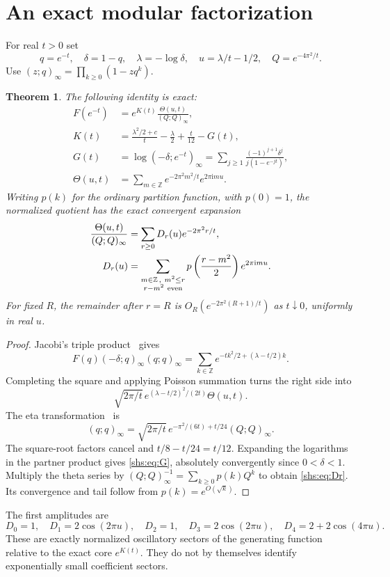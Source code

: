 \documentclass[11pt]{article}
\newtheorem{theorem}{Theorem}[section]
\newcommand{\ii}{\mathrm{i}}
\theoremstyle{definition}
\theoremstyle{plain}
\begin{document}
\section{An exact modular factorization}\label{shs:sec:modular}
For real $t>0$ set
\[
 q=e^{-t},\quad \delta=1-q,\quad \lambda=-\log\delta,\quad
 u=\lambda/t-1/2,\quad Q=e^{-4\pi^2/t}.
\]
Use $(z;q)_\infty=\prod_{k\ge0}(1-zq^k)$.
\begin{theorem}\label{shs:thm:modular}
The following identity is exact:
\begin{align}
 F(e^{-t})&=e^{K(t)}\frac{\Theta(u,t)}{(Q;Q)_\infty},\label{shs:eq:modular}\\
 K(t)&=\frac{\lambda^2/2+c}{t}-\frac\lambda2+\frac t{12}-G(t),\label{shs:eq:K}\\
 G(t)&=\log(-\delta;e^{-t})_\infty
 =\sum_{j\ge1}\frac{(-1)^{j+1}\delta^j}{j(1-e^{-jt})},\label{shs:eq:G}\\
 \Theta(u,t)&=\sum_{m\in\mathbb Z}e^{-2\pi^2m^2/t}e^{2\pi\ii m u}.
\end{align}
Writing $p(k)$ for the ordinary partition function, with $p(0)=1$, the
normalized quotient has the exact convergent expansion
\begin{align}
 \frac{\Theta(u,t)}{(Q;Q)_\infty}
 &=\sum_{r\ge0}D_r(u)e^{-2\pi^2r/t},\label{shs:eq:sectors}\\
 D_r(u)&=\sum_{\substack{m\in\mathbb Z\,,\ m^2\le r\\r-m^2\ {\rm even}}}
 p\left(\frac{r-m^2}{2}\right)e^{2\pi\ii m u}.\label{shs:eq:Dr}
\end{align}
For fixed $R$, the remainder after $r=R$ is
$O_R(e^{-2\pi^2(R+1)/t})$ as $t\downarrow0$, uniformly in real $u$.
\end{theorem}
\begin{proof}
Jacobi's triple product~\cite[17.8.1]{DLMF} gives
\[
 F(q)(-\delta;q)_\infty(q;q)_\infty
 =\sum_{k\in\mathbb Z}e^{-tk^2/2+(\lambda-t/2)k}.
\]
Completing the square and applying Poisson summation turns the right side into
\[
 \sqrt{2\pi/t}\,e^{(\lambda-t/2)^2/(2t)}\Theta(u,t).
\]
The eta transformation~\cite[17.2.6\_1]{DLMF} is
\[
 (q;q)_\infty=\sqrt{2\pi/t}\,e^{-\pi^2/(6t)+t/24}(Q;Q)_\infty.
\]
The square-root factors cancel and $t/8-t/24=t/12$.
Expanding the logarithms in the partner product gives \eqref{shs:eq:G},
absolutely convergently since $0<\delta<1$. Multiply the theta series by
$(Q;Q)_\infty^{-1}=\sum_{k\ge0}p(k)Q^k$ to obtain \eqref{shs:eq:Dr}.
Its convergence and tail follow from $p(k)=e^{O(\sqrt k)}$.
\end{proof}
The first amplitudes are
\[
 D_0=1,\quad D_1=2\cos(2\pi u),\quad D_2=1,\quad
 D_3=2\cos(2\pi u),\quad D_4=2+2\cos(4\pi u).
\]
These are exactly normalized oscillatory sectors of the generating
function relative to the exact core $e^{K(t)}$. They do not by themselves
identify exponentially small coefficient sectors.
\end{document}
